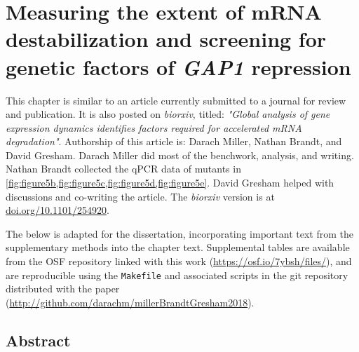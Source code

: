 \chapter{Measuring the extent of mRNA destabilization and screening 
for genetic factors of \textit{GAP1} repression}

This chapter is similar to an article currently submitted to a 
journal for review and publication. 
It is also posted on \textit{biorxiv}, titled:
\textit{"Global analysis of gene expression dynamics identifies factors
required for accelerated mRNA degradation"}.
Authorship of this article is: Darach Miller, Nathan Brandt, 
and David Gresham.
Darach Miller did most of the benchwork, analysis, and writing.
Nathan Brandt collected the qPCR data of mutants in
\autoref{fig:figure5b,fig:figure5c,fig:figure5d,fig:figure5e}.
David Gresham helped with discussions and co-writing the article.
The \textit{biorxiv} version is at \url{doi.org/10.1101/254920}.

The below is adapted for the dissertation, incorporating important
text from the supplementary methods into the chapter text.
Supplemental tables are available from the OSF repository linked 
with this work (\url{https://osf.io/7ybsh/files/}), 
and are reproducible
using the \texttt{Makefile} and associated scripts
in the git repository distributed with the paper
(\url{http://github.com/darachm/millerBrandtGresham2018}).


\section{Abstract}

